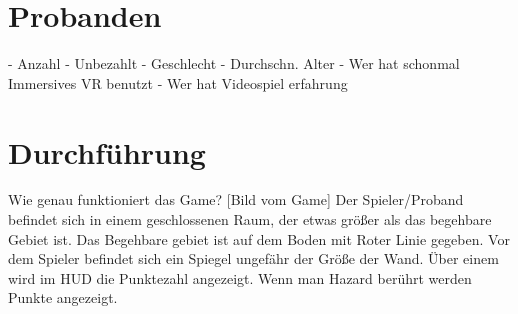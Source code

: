 \section{Probanden}
- Anzahl
- Unbezahlt
- Geschlecht
- Durchschn. Alter
- Wer hat schonmal Immersives VR benutzt
- Wer hat Videospiel erfahrung

\section{Durchführung}
Wie genau funktioniert das Game?
[Bild vom Game]
Der Spieler/Proband befindet sich in einem geschlossenen Raum, der etwas größer als das begehbare Gebiet ist. Das Begehbare gebiet ist auf dem Boden mit Roter Linie gegeben.
Vor dem Spieler befindet sich ein Spiegel ungefähr der Größe der Wand.
Über einem wird im HUD die Punktezahl angezeigt. Wenn man Hazard berührt werden Punkte angezeigt.